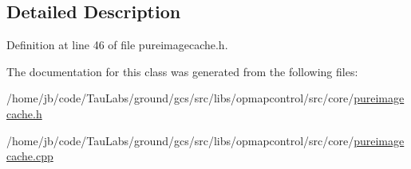 \subsection{\-Detailed \-Description}


\-Definition at line 46 of file pureimagecache.\-h.



\-The documentation for this class was generated from the following files\-:\begin{DoxyCompactItemize}
\item 
/home/jb/code/\-Tau\-Labs/ground/gcs/src/libs/opmapcontrol/src/core/\hyperlink{pureimagecache_8h}{pureimagecache.\-h}\item 
/home/jb/code/\-Tau\-Labs/ground/gcs/src/libs/opmapcontrol/src/core/\hyperlink{pureimagecache_8cpp}{pureimagecache.\-cpp}\end{DoxyCompactItemize}

